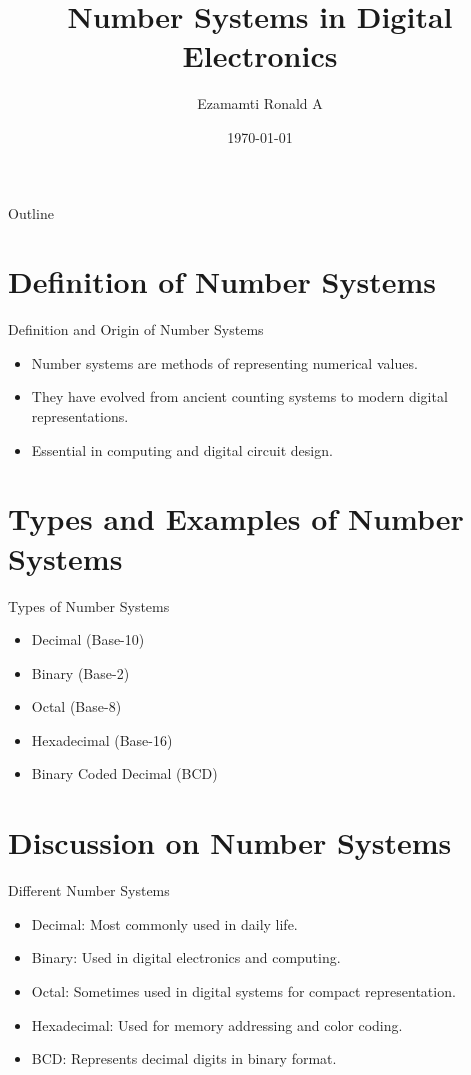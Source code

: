 \documentclass{beamer}
\title{Number Systems in Digital Electronics}
\author{Ezamamti Ronald A}
\date{\today}
\begin{document}
\begin{frame}
    \titlepage
\end{frame}

\begin{frame}{Outline}
    \tableofcontents
\end{frame}

\section{Definition of Number Systems}
\begin{frame}{Definition and Origin of Number Systems}
    \begin{itemize}
        \item Number systems are methods of representing numerical values.
        \item They have evolved from ancient counting systems to modern digital representations.
        \item Essential in computing and digital circuit design.
    \end{itemize}
\end{frame}

\section{Types and Examples of Number Systems}
\begin{frame}{Types of Number Systems}
    \begin{itemize}
        \item Decimal (Base-10)
        \item Binary (Base-2)
        \item Octal (Base-8)
        \item Hexadecimal (Base-16)
        \item Binary Coded Decimal (BCD)
    \end{itemize}
\end{frame}

\section{Discussion on Number Systems}
\begin{frame}{Different Number Systems}
    \begin{itemize}
        \item Decimal: Most commonly used in daily life.
        \item Binary: Used in digital electronics and computing.
        \item Octal: Sometimes used in digital systems for compact representation.
        \item Hexadecimal: Used for memory addressing and color coding.
        \item BCD: Represents decimal digits in binary format.
    \end{itemize}
\end{frame}
\end{document}
